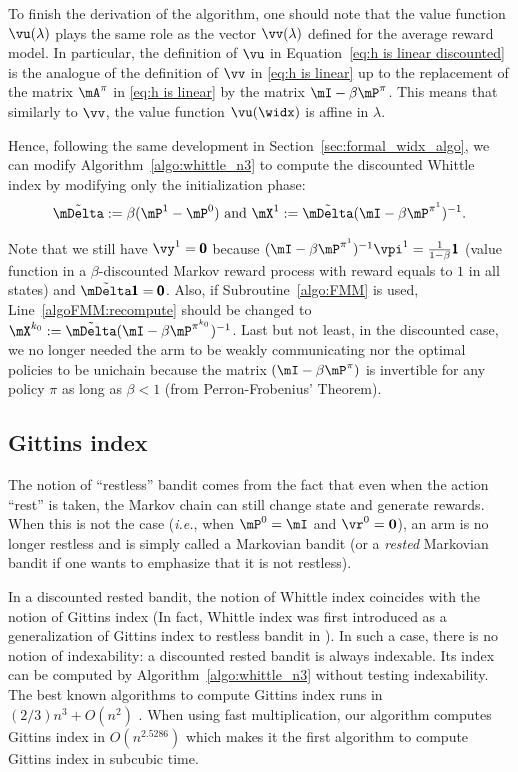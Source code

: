 To finish the derivation of the algorithm, one should note that the value function $\vu(\lambda)$ plays the same role as the vector $\vv(\lambda)$ defined for the average reward model.
In particular, the definition of $\vu$ in Equation~\eqref{eq:h is linear discounted} is the analogue of the definition of $\vv$ in \eqref{eq:h is linear} up to the replacement of the matrix $\mA^\pi$ in \eqref{eq:h is linear} by the matrix $\mI-\beta \mP^\pi$.
This means that similarly to $\vv$, the value function $\vu(\widx)$ is affine in $\lambda$.

Hence, following the same development in Section~\ref{sec:formal_widx_algo}, we can modify Algorithm~\ref{algo:whittle_n3} to compute the discounted Whittle index by modifying only the initialization phase:
\begin{align*}
    \tilde{\mDelta}:=\beta(\mP^1-\mP^0) \text{ and } \mX^1:=\tilde{\mDelta}(\mI-\beta \mP^{\pi^1})^{-1}.
\end{align*}

Note that we still have $\vy^1=\pmb{0}$ because $(\mI-\beta \mP^{\pi^1})^{-1}\vpi^1=\frac1{1-\beta}\pmb{1}$ (value function in a $\beta$-discounted Markov reward process with reward equals to $1$ in all states) and $\tilde{\mDelta}\pmb{1}=\pmb{0}$. Also, if Subroutine~\ref{algo:FMM} is used, Line~\ref{algoFMM:recompute} should be changed to $\mX^{k_0}:=\tilde{\mDelta}(\mI-\beta \mP^{\pi^{k_0}})^{-1}$. Last but not least, in the discounted case, we no longer needed the arm to be weakly communicating nor the optimal policies to be unichain because the matrix $(\mI-\beta \mP^\pi)$ is invertible for any policy $\pi$ as long as $\beta<1$ (from Perron-Frobenius' Theorem).

\subsection{Gittins index}

The notion of ``restless'' bandit comes from the fact that even when the action ``rest'' is taken, the Markov chain can still change state and generate rewards. When this is not the case (\emph{i.e.}, when $\mP^0=\mI$ and $\vr^0=\boldsymbol{0}$), an arm is no longer restless and is simply called a Markovian bandit (or a \emph{rested} Markovian bandit if one wants to emphasize that it is not restless).

In a discounted rested bandit, the notion of Whittle index coincides with the notion of Gittins index (In fact, Whittle index was first introduced as a generalization of Gittins index to restless bandit in \cite{whittle1988restless}). In such a case, there is no notion of indexability: a discounted rested bandit is always indexable. Its index can be computed by Algorithm~\ref{algo:whittle_n3} without testing indexability. The best known algorithms to compute Gittins index runs in $(2/3) n^3 +O(n^2)$ \cite{chakravorty2014multi}. When using fast multiplication, our algorithm computes Gittins index in $O(n^{2.5286})$ which makes it the first algorithm to compute Gittins index in subcubic time.  

